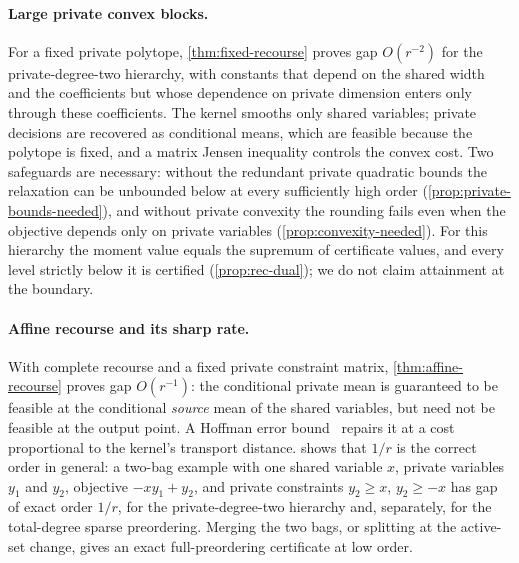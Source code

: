\paragraph{Large private convex blocks.}
For a fixed private polytope, \cref{thm:fixed-recourse} proves gap
$O(r^{-2})$ for the private-degree-two hierarchy, with constants that depend
on the shared width and the coefficients but whose dependence on private
dimension enters only through these coefficients. The kernel smooths only
shared variables; private decisions are recovered as conditional means,
which are feasible because the polytope is fixed, and a matrix Jensen
inequality controls the convex cost. Two safeguards are necessary: without
the redundant private quadratic bounds the relaxation can be unbounded
below at every sufficiently high order (\cref{prop:private-bounds-needed}),
and without private convexity the rounding fails even when the objective depends only
on private variables (\cref{prop:convexity-needed}). For this hierarchy
the moment value equals the supremum of certificate values, and every level strictly below it is
certified (\cref{prop:rec-dual}); we do not claim attainment at the
boundary.

\paragraph{Affine recourse and its sharp rate.}
With complete recourse and a fixed private constraint matrix,
\cref{thm:affine-recourse} proves gap $O(r^{-1})$: the conditional private
mean is guaranteed to be feasible at the conditional \emph{source} mean
of the shared variables, but need not be feasible at the output point. A Hoffman error
bound~\cite{hoffman1952-approximate-solutions} repairs it at a cost
proportional to the kernel's transport distance. 
shows that $1/r$ is the correct order in general: a two-bag example with one
shared variable $x$, private variables $y_1$ and $y_2$, objective $-xy_1+y_2$,
and private constraints $y_2\ge x$, $y_2\ge-x$ has gap of exact order
$1/r$, for the private-degree-two hierarchy and, separately, for the
total-degree sparse preordering. Merging the two bags, or splitting at the
active-set change, gives an exact full-preordering certificate at low order.

